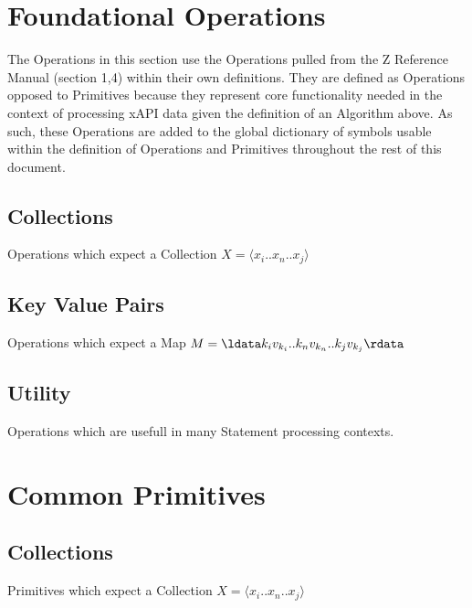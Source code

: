 \documentclass{article}
\begin{document}




\section{Foundational Operations}
The Operations in this section use the Operations pulled from the Z Reference Manual (section 1,4) within their own definitions.
They are defined as Operations opposed to Primitives because they represent core functionality needed in the context
of processing xAPI data given the definition of an Algorithm above. As such, these Operations are added to the global
dictionary of symbols usable within the definition of Operations and Primitives throughout the rest of this document.
\subsection{Collections}
Operations which expect a Collection $X = \langle x_{i}..x_{n}..x_{j} \rangle$





\subsection{Key Value Pairs}
Operations which expect a Map $M = \ldata k_{i}v_{k_{i}}..k_{n}v_{k_{n}}..k_{j}v_{k_{j}} \rdata$






\subsection{Utility}
Operations which are usefull in many Statement processing contexts.





\section{Common Primitives}
\subsection{Collections}
Primitives which expect a Collection $X = \langle x_{i}..x_{n}..x_{j} \rangle$

\end{document}
